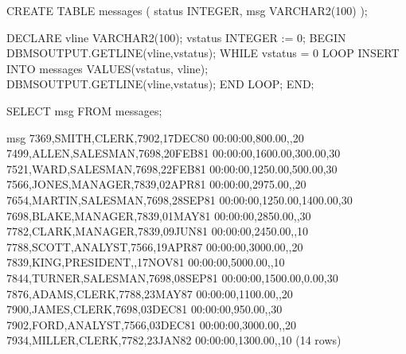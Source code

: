 \documentclass[letterpaper,10pt,english,openany,oneside]{sphinxmanual}
\begin{document}
%
\begin{sphinxVerbatim}[commandchars=\\\{\}]
CREATE TABLE messages (
    status          INTEGER,
    msg             VARCHAR2(100)
);

DECLARE
    v\PYGZus{}line          VARCHAR2(100);
    v\PYGZus{}status        INTEGER := 0;
BEGIN
    DBMS\PYGZus{}OUTPUT.GET\PYGZus{}LINE(v\PYGZus{}line,v\PYGZus{}status);
    WHILE v\PYGZus{}status = 0 LOOP
        INSERT INTO messages VALUES(v\PYGZus{}status, v\PYGZus{}line);
        DBMS\PYGZus{}OUTPUT.GET\PYGZus{}LINE(v\PYGZus{}line,v\PYGZus{}status);
    END LOOP;
END;

SELECT msg FROM messages;

                               msg
\PYGZhy{}\PYGZhy{}\PYGZhy{}\PYGZhy{}\PYGZhy{}\PYGZhy{}\PYGZhy{}\PYGZhy{}\PYGZhy{}\PYGZhy{}\PYGZhy{}\PYGZhy{}\PYGZhy{}\PYGZhy{}\PYGZhy{}\PYGZhy{}\PYGZhy{}\PYGZhy{}\PYGZhy{}\PYGZhy{}\PYGZhy{}\PYGZhy{}\PYGZhy{}\PYGZhy{}\PYGZhy{}\PYGZhy{}\PYGZhy{}\PYGZhy{}\PYGZhy{}\PYGZhy{}\PYGZhy{}\PYGZhy{}\PYGZhy{}\PYGZhy{}\PYGZhy{}\PYGZhy{}\PYGZhy{}\PYGZhy{}\PYGZhy{}\PYGZhy{}\PYGZhy{}\PYGZhy{}\PYGZhy{}\PYGZhy{}\PYGZhy{}\PYGZhy{}\PYGZhy{}\PYGZhy{}\PYGZhy{}\PYGZhy{}\PYGZhy{}\PYGZhy{}\PYGZhy{}\PYGZhy{}\PYGZhy{}\PYGZhy{}\PYGZhy{}\PYGZhy{}\PYGZhy{}\PYGZhy{}\PYGZhy{}\PYGZhy{}\PYGZhy{}\PYGZhy{}\PYGZhy{}
 7369,SMITH,CLERK,7902,17\PYGZhy{}DEC\PYGZhy{}80 00:00:00,800.00,,20
 7499,ALLEN,SALESMAN,7698,20\PYGZhy{}FEB\PYGZhy{}81 00:00:00,1600.00,300.00,30
 7521,WARD,SALESMAN,7698,22\PYGZhy{}FEB\PYGZhy{}81 00:00:00,1250.00,500.00,30
 7566,JONES,MANAGER,7839,02\PYGZhy{}APR\PYGZhy{}81 00:00:00,2975.00,,20
 7654,MARTIN,SALESMAN,7698,28\PYGZhy{}SEP\PYGZhy{}81 00:00:00,1250.00,1400.00,30
 7698,BLAKE,MANAGER,7839,01\PYGZhy{}MAY\PYGZhy{}81 00:00:00,2850.00,,30
 7782,CLARK,MANAGER,7839,09\PYGZhy{}JUN\PYGZhy{}81 00:00:00,2450.00,,10
 7788,SCOTT,ANALYST,7566,19\PYGZhy{}APR\PYGZhy{}87 00:00:00,3000.00,,20
 7839,KING,PRESIDENT,,17\PYGZhy{}NOV\PYGZhy{}81 00:00:00,5000.00,,10
 7844,TURNER,SALESMAN,7698,08\PYGZhy{}SEP\PYGZhy{}81 00:00:00,1500.00,0.00,30
 7876,ADAMS,CLERK,7788,23\PYGZhy{}MAY\PYGZhy{}87 00:00:00,1100.00,,20
 7900,JAMES,CLERK,7698,03\PYGZhy{}DEC\PYGZhy{}81 00:00:00,950.00,,30
 7902,FORD,ANALYST,7566,03\PYGZhy{}DEC\PYGZhy{}81 00:00:00,3000.00,,20
 7934,MILLER,CLERK,7782,23\PYGZhy{}JAN\PYGZhy{}82 00:00:00,1300.00,,10
(14 rows)
\end{sphinxVerbatim}

\newpage
\end{document}
